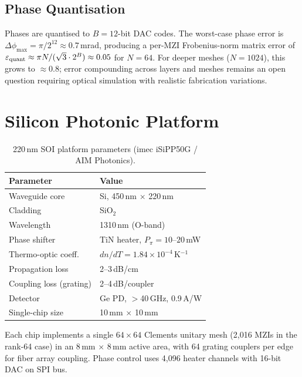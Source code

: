 \documentclass[journal]{IEEEtran}
\begin{document}
\subsection{Phase Quantisation}

Phases are quantised to $B=12$-bit DAC codes.
The worst-case phase error is $\Delta\phi_{\max} = \pi/2^{12} \approx 0.7$\,mrad,
producing a per-MZI Frobenius-norm matrix error of
$\varepsilon_{\rm quant} \approx \pi N / (\sqrt{3}\cdot2^B) \approx 0.05$
for $N=64$.
For deeper meshes ($N = 1024$), this grows to $\approx 0.8$; error compounding
across layers and meshes remains an open question requiring optical simulation
with realistic fabrication variations.

\section{Silicon Photonic Platform}
\label{sec:platform}

\begin{table}[t]
\centering
\caption{220\,nm SOI platform parameters (imec iSiPP50G / AIM Photonics).}
\label{tab:platform}
\begin{tabular}{ll}
\toprule
\textbf{Parameter} & \textbf{Value} \\
\midrule
Waveguide core & Si, 450\,nm $\times$ 220\,nm \\
Cladding & SiO$_2$ \\
Wavelength & 1310\,nm (O-band) \\
Phase shifter & TiN heater, $P_\pi = 10$--$20$\,mW \\
Thermo-optic coeff. & $dn/dT = 1.84\times10^{-4}$\,K$^{-1}$ \\
Propagation loss & 2--3\,dB/cm \\
Coupling loss (grating) & 2--4\,dB/coupler \\
Detector & Ge PD, $>$40\,GHz, 0.9\,A/W \\
Single-chip size & 10\,mm $\times$ 10\,mm \\
\bottomrule
\end{tabular}
\end{table}

Each chip implements a single $64\times64$ Clements unitary mesh
(2,016 MZIs in the rank-64 case) in an 8\,mm $\times$ 8\,mm active area,
with 64 grating couplers per edge for fiber array coupling.
Phase control uses 4,096 heater channels with 16-bit DAC on SPI bus.

\end{document}
